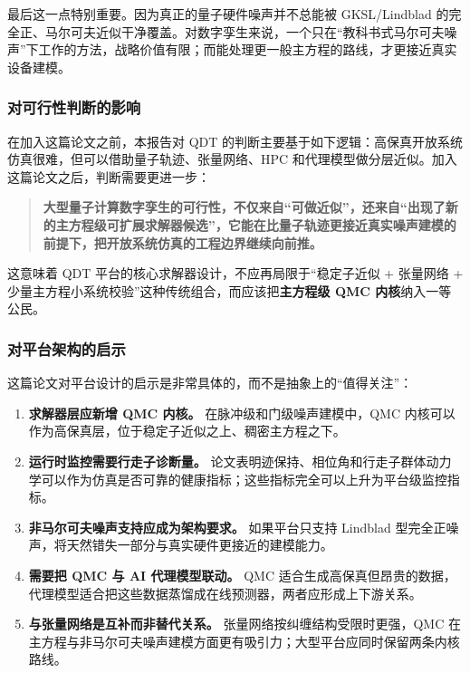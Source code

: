 \documentclass[11pt,a4paper]{article}
\newcommand{\QDT}{QDT}
\begin{document}
最后这一点特别重要。因为真正的量子硬件噪声并不总能被 GKSL/Lindblad 的完全正、马尔可夫近似干净覆盖。对数字孪生来说，一个只在“教科书式马尔可夫噪声”下工作的方法，战略价值有限；而能处理更一般主方程的路线，才更接近真实设备建模。

\subsubsection{对可行性判断的影响}

在加入这篇论文之前，本报告对 QDT 的判断主要基于如下逻辑：高保真开放系统仿真很难，但可以借助量子轨迹、张量网络、HPC 和代理模型做分层近似。加入这篇论文之后，判断需要更进一步：

\begin{quote}
\textbf{大型量子计算数字孪生的可行性，不仅来自“可做近似”，还来自“出现了新的主方程级可扩展求解器候选”，它能在比量子轨迹更接近真实噪声建模的前提下，把开放系统仿真的工程边界继续向前推。}
\end{quote}

这意味着 \QDT{} 平台的核心求解器设计，不应再局限于“稳定子近似 + 张量网络 + 少量主方程小系统校验”这种传统组合，而应该把\textbf{主方程级 QMC 内核}纳入一等公民。

\subsubsection{对平台架构的启示}

这篇论文对平台设计的启示是非常具体的，而不是抽象上的“值得关注”：

\begin{enumerate}
  \item \textbf{求解器层应新增 QMC 内核。} 在脉冲级和门级噪声建模中，QMC 内核可以作为高保真层，位于稳定子近似之上、稠密主方程之下。
  \item \textbf{运行时监控需要行走子诊断量。} 论文表明迹保持、相位角和行走子群体动力学可以作为仿真是否可靠的健康指标；这些指标完全可以上升为平台级监控指标。
  \item \textbf{非马尔可夫噪声支持应成为架构要求。} 如果平台只支持 Lindblad 型完全正噪声，将天然错失一部分与真实硬件更接近的建模能力。
  \item \textbf{需要把 QMC 与 AI 代理模型联动。} QMC 适合生成高保真但昂贵的数据，代理模型适合把这些数据蒸馏成在线预测器，两者应形成上下游关系。
  \item \textbf{与张量网络是互补而非替代关系。} 张量网络按纠缠结构受限时更强，QMC 在主方程与非马尔可夫噪声建模方面更有吸引力；大型平台应同时保留两条内核路线。
\end{enumerate}
\end{document}
